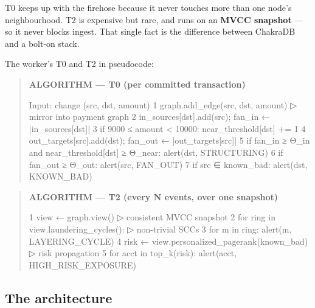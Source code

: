 \documentclass[
  11pt,
  openany]{book}
\newenvironment{Shaded}{}{}
\newcommand{\NormalTok}[1]{#1}
\begin{document}
T0 keeps up with the firehose because it never touches more than one
node's neighbourhood. T2 is expensive but rare, and runs on an
\textbf{MVCC snapshot} --- so it never blocks ingest. That single fact
is the difference between ChakraDB and a bolt-on stack.

The worker's T0 and T2 in pseudocode:

\begin{quote}
\textbf{ALGORITHM --- T0 (per committed transaction)}

\begin{Shaded}
\begin{Highlighting}[]
\NormalTok{Input: change (src, dst, amount)}
\NormalTok{1  graph.add\_edge(src, dst, amount)                 ▷ mirror into payment graph}
\NormalTok{2  in\_sources[dst].add(src);  fan\_in ← |in\_sources[dst]|}
\NormalTok{3  if 9000 ≤ amount \textless{} 10000: near\_threshold[dst] += 1}
\NormalTok{4  out\_targets[src].add(dst); fan\_out ← |out\_targets[src]|}
\NormalTok{5  if fan\_in ≥ Θ\_in  and  near\_threshold[dst] ≥ Θ\_near:  alert(dst, STRUCTURING)}
\NormalTok{6  if fan\_out ≥ Θ\_out:                                    alert(src, FAN\_OUT)}
\NormalTok{7  if src ∈ known\_bad:                                    alert(dst, KNOWN\_BAD)}
\end{Highlighting}
\end{Shaded}
\end{quote}

\begin{quote}
\textbf{ALGORITHM --- T2 (every N events, over one snapshot)}

\begin{Shaded}
\begin{Highlighting}[]
\NormalTok{1  view ← graph.view()                               ▷ consistent MVCC snapshot}
\NormalTok{2  for ring in view.laundering\_cycles():             ▷ non{-}trivial SCCs}
\NormalTok{3      for m in ring: alert(m, LAYERING\_CYCLE)}
\NormalTok{4  risk ← view.personalized\_pagerank(known\_bad)       ▷ risk propagation}
\NormalTok{5  for acct in top\_k(risk): alert(acct, HIGH\_RISK\_EXPOSURE)}
\end{Highlighting}
\end{Shaded}
\end{quote}

\subsection{The architecture}\label{the-architecture}
\end{document}
